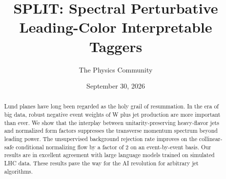 \documentclass[11pt]{article}
\title{SPLIT: Spectral Perturbative Leading-Color Interpretable Taggers}
\author{The Physics Community}
\date{September 30, 2026}
\begin{document}
\maketitle
\begin{abstract}
Lund planes have long been regarded as the holy grail of resummation. In
the era of big data, robust negative event weights of W plus jet
production are more important than ever. We show that the interplay
between unitarity-preserving heavy-flavor jets and normalized form
factors suppresses the transverse momentum spectrum beyond leading
power. The unsupervised background rejection rate improves on the
collinear-safe conditional normalizing flow by a factor of 2 on an
event-by-event basis. Our results are in excellent agreement with large
language models trained on simulated LHC data. These results pave the
way for the AI revolution for arbitrary jet algorithms.
\end{abstract}
\tableofcontents





\nocite{*}


\end{document}
